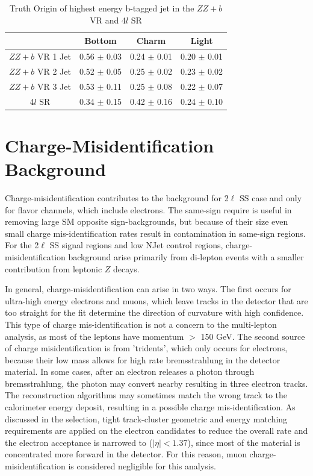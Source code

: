 \begin{table}[htbp]
\centering 
\begin{tabular}{|c|c|c|c|} 
  \hline
                 & Bottom      & Charm       & Light \\
  \hline
  $ZZ+b$ VR 1 Jet& 0.56 $\pm$ 0.03 & 0.24 $\pm$ 0.01 & 0.20 $\pm$ 0.01 \\ 
  $ZZ+b$ VR 2 Jet& 0.52 $\pm$ 0.05 & 0.25 $\pm$ 0.02 & 0.23 $\pm$ 0.02 \\ 
  $ZZ+b$ VR 3 Jet& 0.53 $\pm$ 0.11 & 0.25 $\pm$ 0.08 & 0.22 $\pm$ 0.07 \\
  4$l$ SR        & 0.34 $\pm$ 0.15 & 0.42 $\pm$ 0.16 & 0.24 $\pm$ 0.10 \\
  \hline 
\end{tabular}
\caption{Truth Origin of highest energy b-tagged jet in the $ZZ+b$ VR and 4$l$ SR} 
\label{table:zz_truth}
\end{table} 


\section{Charge-Misidentification Background }
\label{section:qmis} 
Charge-misidentification contributes to the background for 2$\ell$ SS case and only for flavor channels, which include electrons. The same-sign require is useful in removing large SM opposite sign-backgrounds, but because of their size even small charge mis-identification rates result in contamination in same-sign regions. For the 2$\ell$ SS signal regions and low NJet control regions, charge-misidentification background arise primarily from \ttbar di-lepton events with a smaller contribution from leptonic $Z$ decays. 

In general, charge-misidentification can arise in two ways. The first occurs for ultra-high energy electrons and muons, which leave tracks in the detector that are too straight for the fit determine the direction of curvature with high confidence. This type of charge mis-identification is not a concern to the \tth multi-lepton analysis, as most of the leptons have momentum $>$ 150 GeV. The second source of charge misidentification is from 'tridents', which only occurs for electrons, because their low mass allows for high rate bremsstrahlung in the detector material. In some cases, after an electron releases a photon through bremsstrahlung, the photon may convert nearby resulting in three electron tracks. The reconstruction algorithms may sometimes match the wrong track to the calorimeter energy deposit, resulting in a possible charge mis-identification. As discussed in the selection, tight track-cluster geometric and energy matching requirements are applied on the electron candidates to reduce the overall rate and the electron acceptance is narrowed to ($|\eta| < 1.37$), since most of the material is concentrated more forward in the detector. For this reason, muon charge-misidentification is considered negligible for this analysis.

